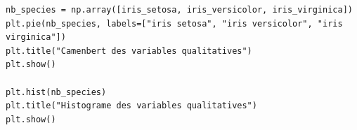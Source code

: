 \begin{lstlisting}[style=myPython, caption=Code Python pour tracer le diagramme camenbert et l'histogramme, frame=lines]
nb_species = np.array([iris_setosa, iris_versicolor, iris_virginica])
plt.pie(nb_species, labels=["iris setosa", "iris versicolor", "iris virginica"])
plt.title("Camenbert des variables qualitatives")
plt.show()

plt.hist(nb_species)
plt.title("Histograme des variables qualitatives")
plt.show()
\end{lstlisting}

